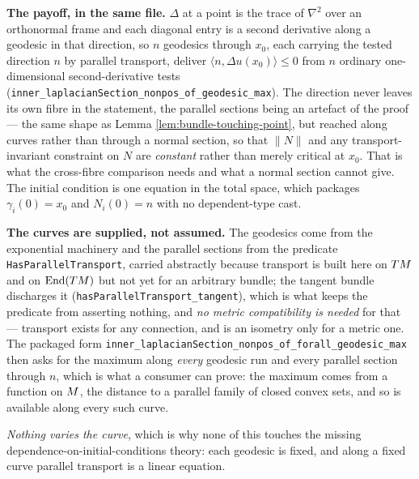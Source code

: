 \begin{lemma}
  \textbf{The payoff, in the same file.} $\Delta$ at a point is the trace of $\nabla^2$ over
  an orthonormal frame and each diagonal entry is a second derivative along a geodesic in that
  direction, so $n$ geodesics through $x_0$, each carrying the tested direction $n$ by
  parallel transport, deliver $\langle n, \Delta u(x_0)\rangle \le 0$ from $n$ ordinary
  one-dimensional second-derivative tests
  (\texttt{inner\_laplacianSection\_nonpos\_of\_geodesic\_max}). The direction never leaves
  its own fibre in the statement, the parallel sections being an artefact of the proof --- the
  same shape as Lemma \ref{lem:bundle-touching-point}, but reached along curves rather than
  through a normal section, so that $\|N\|$ and any transport-invariant constraint on $N$ are
  \emph{constant} rather than merely critical at $x_0$. That is what the cross-fibre
  comparison needs and what a normal section cannot give. The initial condition is one
  equation in the total space, which packages $\gamma_i(0) = x_0$ and $N_i(0) = n$ with no
  dependent-type cast.

  \textbf{The curves are supplied, not assumed.} The geodesics come from the exponential
  machinery and the parallel sections from the predicate
  \texttt{HasParallelTransport}, carried abstractly because transport is built here on $TM$
  and on $\operatorname{End}(TM)$ but not yet for an arbitrary bundle; the tangent bundle
  discharges it (\texttt{hasParallelTransport\_tangent}), which is what keeps the predicate
  from asserting nothing, and \emph{no metric compatibility is needed} for that --- transport
  exists for any connection, and is an isometry only for a metric one. The packaged form
  \texttt{inner\_laplacian\-Section\_nonpos\_of\_forall\_geodesic\_max} then asks for the
  maximum along \emph{every} geodesic run and every parallel section through $n$, which is
  what a consumer can prove: the maximum comes from a function on $M$, the distance to a
  parallel family of closed convex sets, and so is available along every such curve.

  \emph{Nothing varies the curve}, which is why none of this touches the missing
  dependence-on-initial-conditions theory: each geodesic is fixed, and along a fixed curve
  parallel transport is a linear equation.
\end{lemma}

